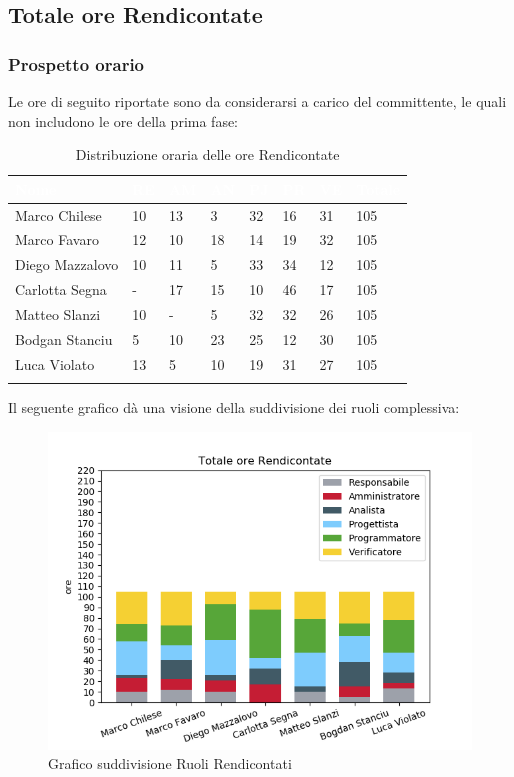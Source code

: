 \newpage
\subsection{Totale ore Rendicontate}
\label{PTRR}
\subsubsection{Prospetto orario}

Le ore di seguito riportate sono da considerarsi a carico del committente, le quali non includono le ore della prima fase:

\begin{longtable}{|C{.30\textwidth}|C{.06\textwidth}|C{.06\textwidth}|C{.06\textwidth} | C{.06\textwidth}| C{.06\textwidth} | C{.06\textwidth} | C{.10\textwidth} |}
\hline
{}	\textbf{\textcolor{white}{Nome}} & \textbf{\textcolor{white}{RE}} & \textbf{\textcolor{white}{AM}} & \textbf{\textcolor{white}{AN}} & \textbf{\textcolor{white}{PJ}} & \textbf{\textcolor{white}{PR}} & \textbf{\textcolor{white}{VE}} & \textbf{\textcolor{white}{Totale}}\\
\hline 
Marco Chilese & 10 & 13 & 3 & 32 & 16 & 31 & 105\\
\hline
{}Marco Favaro & 12 & 10 & 18 & 14 & 19 & 32 & 105\\
\hline
Diego Mazzalovo & 10 & 11 & 5 & 33 & 34 & 12 & 105\\
\hline
{}Carlotta Segna & - & 17 & 15 & 10 & 46 & 17 & 105\\
\hline
Matteo Slanzi & 10 & - & 5 & 32 & 32 & 26 & 105\\
\hline
{}Bodgan Stanciu & 5 & 10 & 23 & 25 & 12 & 30 & 105\\
\hline
Luca Violato & 13 & 5 & 10 & 19 & 31 & 27 & 105 \\
\hline

\caption{Distribuzione oraria delle ore Rendicontate}
\label{Distribuzione oraria delle ore rendicontate}
\end{longtable}

Il seguente grafico dà una visione della suddivisione dei ruoli complessiva:

\begin{figure}[H]
	\centering
  		\includegraphics[width=0.8\linewidth]{./images/fig_tor.png}
  		\caption{Grafico suddivisione Ruoli Rendicontati}
  		\label{fig:grafico suddivione ruoli}
\end{figure}


